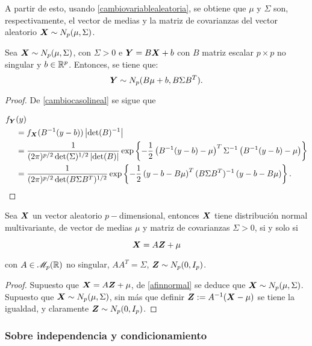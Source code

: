 A partir de esto, usando \ref{cambiovariablealeatoria}, se obtiene que $\mu$ y $\Sigma$ son, respectivamente, el vector de medias y la matriz de covarianzas del vector aleatorio $\boldsymbol{X} \sim N_p(\mu,\Sigma)$.


\begin{nprop} \label{afinnormal}
  Sea $\boldsymbol{X} \sim N_p(\mu,\Sigma)$, con $\Sigma > 0$ e $\boldsymbol{Y} = B\boldsymbol{X}+b$ con $B$ matriz escalar $p\times p$ no singular y $b\in\mathbb{R}^p$. Entonces, se tiene que:
  \[
     \boldsymbol{Y} \sim N_p(B\mu+b, B \Sigma B^T)
  .\]
\end{nprop}

\begin{proof}
  De \ref{cambiocasolineal} se sigue que

  \[
  \begin{split}
    f_{\boldsymbol{Y}} & (y) \\
    & = f_{\boldsymbol{X}}(B^{-1}(y-b))\left|\det(B)^{-1}\right| \\
    & = \frac{1}{(2\pi)^{p/2} \det(\Sigma)^{1/2} \left|\det(B)\right|}
    \exp\left\{ -\frac{1}{2} \left(B^{-1}(y-b) - \mu\right)^T \Sigma^{-1} \left(B^{-1}(y-b) - \mu \right) \right\} \\
    & = \frac{1}{(2\pi)^{p/2} \det(B\Sigma B^T)^{1/2}}
    \exp\left\{ -\frac{1}{2} \left(y-b - B\mu\right)^T (B\Sigma B^T)^{-1} \left(y - b - B\mu \right) \right\}.
  \end{split}
  \]
\end{proof}

\begin{nth} \label{posvar:car-i}
  Sea $\boldsymbol{X}$ un vector aleatorio $p-$dimensional, entonces $\boldsymbol{X}$ tiene distribución normal multivariante, de vector de medias $\mu$ y matriz de covarianzas $\Sigma > 0$, si y solo si
  
  \[
    \boldsymbol{X} = A\boldsymbol{Z} + \mu
  \]
    
con $A\in \mathscr{M}_{p}(\mathbb{R})$ no singular, $AA^T = \Sigma$, $\boldsymbol{Z} \sim N_p(0,I_p)$.
\end{nth}

\begin{proof}
  Supuesto que $\boldsymbol{X} = A\boldsymbol{Z} + \mu$, de \ref{afinnormal} se deduce que $\boldsymbol{X} \sim N_p(\mu, \Sigma)$. Supuesto que $\boldsymbol{X} \sim N_p(\mu, \Sigma)$,
  sin más que definir $\boldsymbol{Z} := A^{-1}(\boldsymbol{X} - \mu)$ se tiene la igualdad, y claramente $\boldsymbol{Z} \sim N_p(0, I_p)$.
\end{proof}

\subsubsection{Sobre independencia y condicionamiento}

